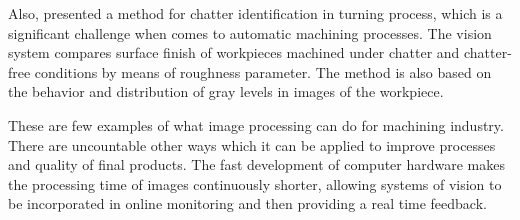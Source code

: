 Also,  presented a method for chatter identification in turning process, which is a significant challenge when comes to automatic machining processes. The vision system compares surface finish of workpieces machined under chatter and chatter-free conditions by means of roughness parameter. The method is also based on the behavior and distribution of gray levels in images of the workpiece.

 These are few examples of what image processing can do for machining industry. There are uncountable other ways which it can be applied to improve processes and quality of final products. The fast development of computer hardware makes the processing time of images continuously shorter, allowing systems of vision to be incorporated in online monitoring and then providing a real time feedback.